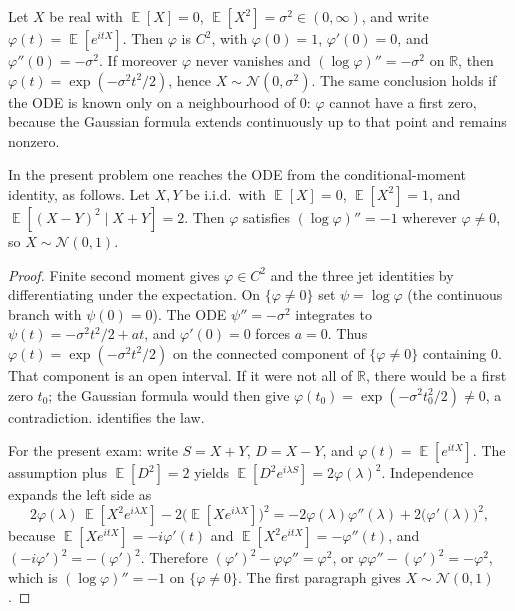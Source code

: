 \documentclass[11pt,a4paper]{article}
\DeclareMathOperator{\E}{\mathbb{E}}
\begin{document}
\begin{proposition}[The ODE \( (\log\varphi)''=-\sigma^{2} \)]
\label{prop:chf-ode-gaussian}
Let \( X \) be real with \( \E[X]=0 \), \( \E[X^{2}]=\sigma^{2}\in(0,\infty) \), and write \( \varphi(t)=\E[e^{itX}] \). Then \( \varphi \) is \( C^{2} \), with \( \varphi(0)=1 \), \( \varphi'(0)=0 \), and \( \varphi''(0)=-\sigma^{2} \). If moreover \( \varphi \) never vanishes and \( (\log\varphi)''=-\sigma^{2} \) on \( \mathbb{R} \), then \( \varphi(t)=\exp(-\sigma^{2}t^{2}/2) \), hence \( X\sim\mathcal{N}(0,\sigma^{2}) \). The same conclusion holds if the ODE is known only on a neighbourhood of \( 0 \): \( \varphi \) cannot have a first zero, because the Gaussian formula extends continuously up to that point and remains nonzero.

In the present problem one reaches the ODE from the conditional-moment identity, as follows. Let \( X,Y \) be i.i.d.\ with \( \E[X]=0 \), \( \E[X^{2}]=1 \), and \( \E[(X-Y)^{2}\mid X+Y]=2 \). Then \( \varphi \) satisfies \( (\log\varphi)''=-1 \) wherever \( \varphi\neq 0 \), so \( X\sim\mathcal{N}(0,1) \).
\end{proposition}

\begin{proof}
Finite second moment gives \( \varphi\in C^{2} \) and the three jet identities by differentiating under the expectation. On \( \{\varphi\neq 0\} \) set \( \psi=\log\varphi \) (the continuous branch with \( \psi(0)=0 \)). The ODE \( \psi''=-\sigma^{2} \) integrates to \( \psi(t)=-\sigma^{2}t^{2}/2+at \), and \( \varphi'(0)=0 \) forces \( a=0 \). Thus \( \varphi(t)=\exp(-\sigma^{2}t^{2}/2) \) on the connected component of \( \{\varphi\neq 0\} \) containing \( 0 \). That component is an open interval. If it were not all of \( \mathbb{R} \), there would be a first zero \( t_0 \); the Gaussian formula would then give \( \varphi(t_0)=\exp(-\sigma^{2}t_0^{2}/2)\neq 0 \), a contradiction.  identifies the law.

For the present exam: write \( S=X+Y \), \( D=X-Y \), and \( \varphi(t)=\E[e^{itX}] \). The assumption plus \( \E[D^{2}]=2 \) yields \( \E[D^{2}e^{i\lambda S}]=2\varphi(\lambda)^{2} \). Independence expands the left side as
\[
2\varphi(\lambda)\,\E[X^{2}e^{i\lambda X}]-2\bigl(\E[Xe^{i\lambda X}]\bigr)^{2}
=
-2\varphi(\lambda)\varphi''(\lambda)+2\bigl(\varphi'(\lambda)\bigr)^{2},
\]
because \( \E[Xe^{itX}]=-i\varphi'(t) \) and \( \E[X^{2}e^{itX}]=-\varphi''(t) \), and \( (-i\varphi')^{2}=-(\varphi')^{2} \). Therefore \( (\varphi')^{2}-\varphi\varphi''=\varphi^{2} \), or \( \varphi\varphi''-(\varphi')^{2}=-\varphi^{2} \), which is \( (\log\varphi)''=-1 \) on \( \{\varphi\neq 0\} \). The first paragraph gives \( X\sim\mathcal{N}(0,1) \).
\end{proof}
\end{document}
